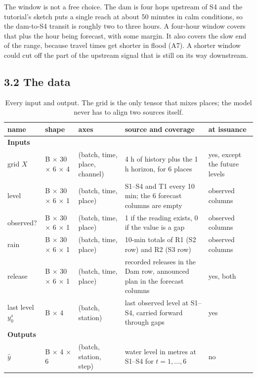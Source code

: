 \documentclass[11pt,letterpaper]{article}
\begin{document}
The window is not a free choice. The dam is four hops upstream of S4 and the
tutorial's sketch puts a single reach at about 50 minutes in calm conditions, so
the dam-to-S4 transit is roughly two to three hours. A four-hour window covers
that plus the hour being forecast, with some margin. It also covers the slow end
of the range, because travel times get shorter in flood (A7). A shorter window
could cut off the part of the upstream signal that is still on its way downstream.

\subsection*{3.2 The data}

\begin{table}[H]
\centering
\small
\begin{tabular}{@{}p{0.8in}p{1.1in}p{1.25in}p{2.2in}p{0.85in}@{}}
\toprule
\textbf{name} & \textbf{shape} & \textbf{axes} & \textbf{source and coverage} & \textbf{at issuance} \\
\midrule
\textbf{Inputs} & & & & \\
grid $X$ & B $\times$ 30 $\times$ 6 $\times$ 4 & (batch, time, place, channel) & 4 h of history plus the 1 h horizon, for 6 places & yes, except the future levels \\
level & B $\times$ 30 $\times$ 6 $\times$ 1 & (batch, time, place) & S1--S4 and T1 every 10 min; the 6 forecast columns are empty & observed columns \\
observed? & B $\times$ 30 $\times$ 6 $\times$ 1 & (batch, time, place) & 1 if the reading exists, 0 if the value is a gap & observed columns \\
rain & B $\times$ 30 $\times$ 6 $\times$ 1 & (batch, time, place) & 10-min totals of R1 (S2 row) and R2 (S3 row) & observed columns \\
release & B $\times$ 30 $\times$ 6 $\times$ 1 & (batch, time, place) & recorded releases in the Dam row, announced plan in the forecast columns & yes, both \\
last level $y^s_0$ & B $\times$ 4 & (batch, station) & last observed level at S1--S4, carried forward through gaps & yes \\
\textbf{Outputs} & & & & \\
$\hat y$ & B $\times$ 4 $\times$ 6 & (batch, station, step) & water level in metres at S1--S4 for $t=1,\dots,6$ & no \\
\bottomrule
\end{tabular}
\caption{Every input and output. The grid is the only tensor that mixes places; the
model never has to align two sources itself.}
\label{tab:dataprot}
\end{table}
\end{document}
